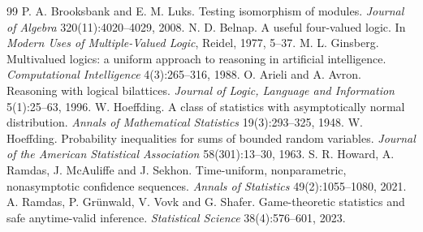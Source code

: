 \documentclass[11pt]{article}
\theoremstyle{definition}
\theoremstyle{plain}
\begin{document}
\begin{thebibliography}{99}
 P. A. Brooksbank and E. M. Luks. Testing isomorphism of modules. \emph{Journal of Algebra} 320(11):4020--4029, 2008.
 N. D. Belnap. A useful four-valued logic. In \emph{Modern Uses of Multiple-Valued Logic}, Reidel, 1977, 5--37.
 M. L. Ginsberg. Multivalued logics: a uniform approach to reasoning in artificial intelligence. \emph{Computational Intelligence} 4(3):265--316, 1988.
 O. Arieli and A. Avron. Reasoning with logical bilattices. \emph{Journal of Logic, Language and Information} 5(1):25--63, 1996.
 W. Hoeffding. A class of statistics with asymptotically normal distribution. \emph{Annals of Mathematical Statistics} 19(3):293--325, 1948.
 W. Hoeffding. Probability inequalities for sums of bounded random variables. \emph{Journal of the American Statistical Association} 58(301):13--30, 1963.
 S. R. Howard, A. Ramdas, J. McAuliffe and J. Sekhon. Time-uniform, nonparametric, nonasymptotic confidence sequences. \emph{Annals of Statistics} 49(2):1055--1080, 2021.
 A. Ramdas, P. Gr\"unwald, V. Vovk and G. Shafer. Game-theoretic statistics and safe anytime-valid inference. \emph{Statistical Science} 38(4):576--601, 2023.

\end{thebibliography}

\appendix
\end{document}
